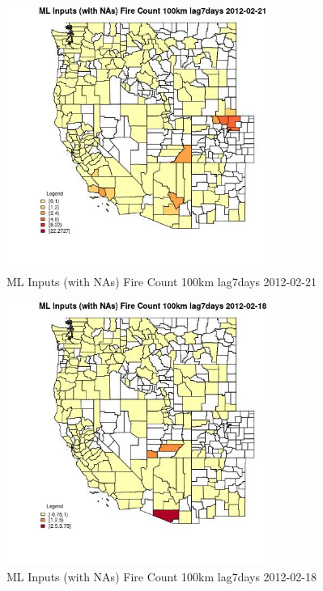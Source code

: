 \begin{figure} 
\centering  
\includegraphics[width=0.77\textwidth]{Code_Outputs/Report_ML_input_PM25_Step4_part_f_de_duplicated_aveswNAs_CountyFire_Count_100km_lag7daysMean2012-02-21.jpg} 
\caption{\label{fig:Report_ML_input_PM25_Step4_part_f_de_duplicated_aveswNAsCountyFire_Count_100km_lag7daysMean2012-02-21}ML Inputs (with NAs) Fire Count 100km lag7days 2012-02-21} 
\end{figure} 
 

\begin{figure} 
\centering  
\includegraphics[width=0.77\textwidth]{Code_Outputs/Report_ML_input_PM25_Step4_part_f_de_duplicated_aveswNAs_CountyFire_Count_100km_lag7daysMean2012-02-18.jpg} 
\caption{\label{fig:Report_ML_input_PM25_Step4_part_f_de_duplicated_aveswNAsCountyFire_Count_100km_lag7daysMean2012-02-18}ML Inputs (with NAs) Fire Count 100km lag7days 2012-02-18} 
\end{figure} 
 


